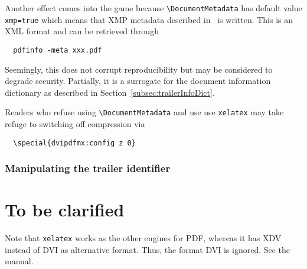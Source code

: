 \documentclass[a4paper, english]{article}%
\newcommand{\xelatex}{\texttt{xelatex}}
\newcommand{\cmd}[1]{\texttt{\textbackslash#1}}
\begin{document}
Another effect comes into the game because \cmd{DocumentMetadata} 
has default value \texttt{xmp=true} which means that XMP metadata 
described in~\cite{ISO16684-1} is written. 
This is an XML format and can be retrieved through 
%
\begin{verbatim}
  pdfinfo -meta xxx.pdf
\end{verbatim}

Seemingly, this does not corrupt reproducibility but may be considered to degrade security. 
Partially, it is a surrogate for the document information dictionary 
as described in Section~\ref{subsec:trailerInfoDict}. 

Readers who refuse using \cmd{DocumentMetadata} and  use use \xelatex{} 
may take refuge to switching off compression via 
%
\begin{verbatim}
  \special{dvipdfmx:config z 0}
\end{verbatim}

\subsubsection{Manipulating the trailer identifier}\label{subsubsec:trailerId}




\section{To be clarified}\label{sec:TBC}

Note that \xelatex{} works as the other engines for PDF, 
whereas it has XDV instead of DVI as alternative format. 
Thus, the format DVI is ignored. 
See the manual. 



{}%
\end{document}
